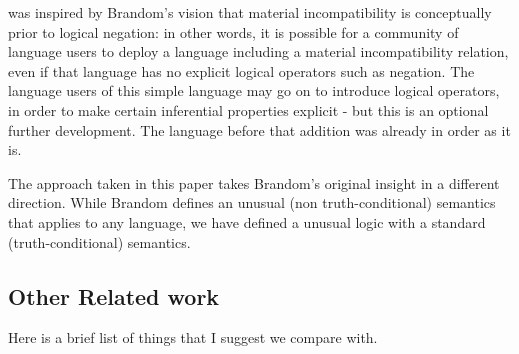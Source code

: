 \ELFULL{} was inspired by Brandom's vision that material incompatibility is conceptually prior to logical negation:
in other words, it is possible for a community of language users to deploy a language including a material incompatibility relation, even if that language has no explicit logical operators such as negation.
The language users of this simple language may go on to introduce logical operators, in order to make certain inferential properties explicit - but this is an optional further development. 
The language before that addition was already in order as it is.

The approach taken in this paper takes Brandom's original insight in a different direction.
While Brandom defines an unusual (non truth-conditional) semantics that applies to any language, we have defined a unusual logic with a standard (truth-conditional) semantics.






\subsection{Other Related work}

Here is a brief list of things that I suggest we compare \ELABR{} with.

